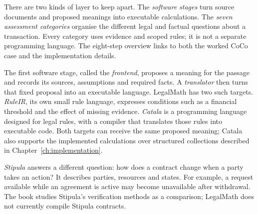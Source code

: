 There are two kinds of layer to keep apart. The \emph{software stages} turn
source documents and proposed meanings into executable calculations. The
\emph{seven assessment categories} organise the different legal and factual
questions about a transaction. Every category uses evidence and scoped rules;
it is not a separate programming language. The eight-step overview links to
both the worked CoCo case and the implementation details.

The first software stage, called the \emph{frontend}, proposes a meaning for the
passage and records its sources, assumptions and required facts. A
\emph{translator} then turns that fixed proposal into an executable language.
LegalMath has two such targets. \emph{RuleIR}, its own small rule language,
expresses conditions such as a financial threshold and the effect of missing
evidence. \emph{Catala} is a programming language designed for legal rules,
with a compiler that translates those rules into executable code. Both targets
can receive the same proposed meaning; Catala also supports the implemented
calculations over structured collections described in Chapter~\ref{ch:implementation}.

\emph{Stipula} answers a different question: how does a contract change when a
party takes an action? It describes parties, resources and states. For example,
a request available while an agreement is active may become unavailable after
withdrawal. The book studies Stipula's verification methods as a comparison;
LegalMath does not currently compile Stipula contracts.

